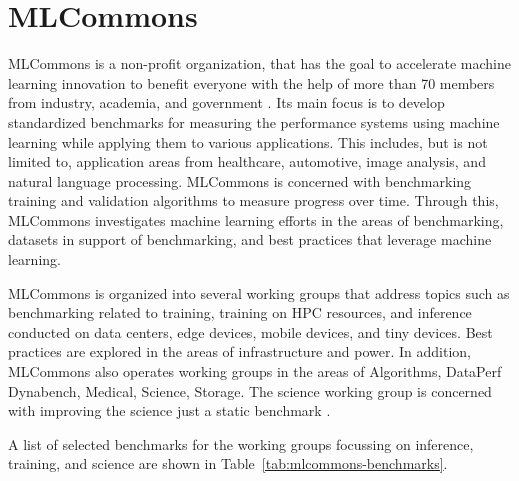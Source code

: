 
\section{MLCommons}
\label{sec:mlcommons}

MLCommons is a non-profit organization, that has the goal to
accelerate machine learning innovation to benefit everyone with the
help of more than 70 members from industry, academia, and government
\cite{www-mlcommons}. Its main focus is to develop standardized
benchmarks for measuring the performance systems using machine
learning while applying them to various applications.  This includes,
but is not limited to, application areas from healthcare, automotive,
image analysis, and natural language processing. MLCommons is
concerned with benchmarking training \cite{mlperf-training} and
validation algorithms to measure progress over time.  Through this,
MLCommons investigates machine learning efforts in the areas of
benchmarking, datasets in support of benchmarking, and best practices
that leverage machine learning.

MLCommons is organized into several working groups that address topics
such as benchmarking related to training, training on HPC resources,
and inference conducted on data centers, edge devices, mobile devices, and
tiny devices. Best practices are explored in the areas of
infrastructure and power.  In addition, MLCommons also operates
working groups in the areas of Algorithms, DataPerf Dynabench,
Medical, Science, Storage.  The science working group is concerned
with improving the science just a static benchmark \cite{las-22-mlcommons-science}.

A list of selected benchmarks for the working groups focussing on
inference, training, and science are shown in Table~\ref{tab:mlcommons-benchmarks}.


